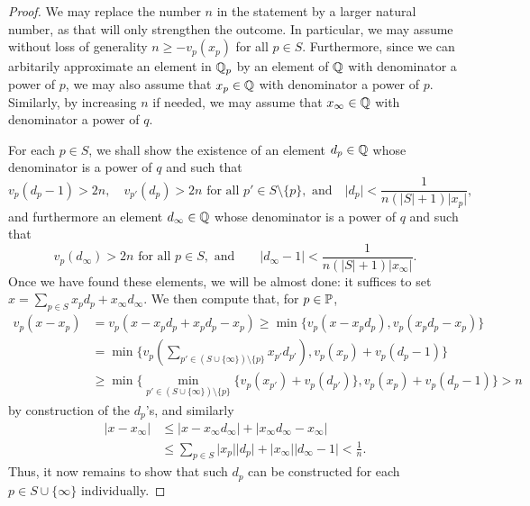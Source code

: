 \documentclass[12pt, leqno, british]{amsart}
\begin{document}
\begin{proof}
We may replace the number $n$ in the statement by a larger natural number, as that will only strengthen the outcome.
In particular, we may assume without loss of generality $n \geq -v_p(x_p)$ for all $p \in S$.
Furthermore, since we can arbitarily approximate an element in $\mathbb Q_p$ by an element of $\mathbb Q$ with denominator a power of $p$, we may also assume that $x_p \in \mathbb Q$ with denominator a power of $p$.
Similarly, by increasing $n$ if needed, we may assume that $x_\infty \in \mathbb Q$ with denominator a power of $q$.

For each $p \in S$, we shall show the existence of an element $d_p \in \mathbb Q$ whose denominator is a power of $q$ and such that
\begin{displaymath}
v_p(d_p-1) > 2n, \quad v_{p'}(d_p) > 2n \text{ for all } p' \in S \setminus \lbrace p \rbrace, \text{ and}\quad \lvert d_p \rvert < \frac{1}{n(\lvert S \rvert + 1) \lvert x_p \rvert},
\end{displaymath}
and furthermore an element $d_\infty \in \mathbb Q$ whose denominator is a power of $q$ and such that
\begin{displaymath}
v_p(d_\infty) > 2n \text{ for all } p \in S, \text{ and}\qquad \lvert d_\infty - 1 \rvert < \frac{1}{n(\lvert S \rvert + 1)\lvert x_\infty \rvert}.
\end{displaymath}
Once we have found these elements, we will be almost done: it suffices to set $x = \sum_{p \in S} x_pd_p + x_\infty d_\infty$.
We then compute that, for $p \in \mathbb P$,
\begin{align*}
v_p(x - x_p) &= v_p(x - x_pd_p + x_pd_p - x_p) \geq \min \lbrace v_p(x - x_pd_p), v_p(x_pd_p - x_p) \rbrace \\
&= \min \lbrace v_p(\sum_{p' \in (S \cup \lbrace \infty \rbrace) \setminus \lbrace p \rbrace} x_{p'}d_{p'}), v_p(x_p) + v_p(d_p - 1) \rbrace \\
&\geq \min \lbrace \min_{p' \in (S \cup \lbrace \infty \rbrace) \setminus \lbrace p \rbrace} \lbrace v_p(x_{p'}) + v_p(d_{p'}) \rbrace, v_p(x_p) + v_p(d_p - 1) \rbrace > n
\end{align*}
by construction of the $d_p$'s, and similarly
\begin{align*}
\lvert x - x_\infty \rvert &\leq \lvert x - x_\infty d_\infty \rvert + \lvert x_\infty d_\infty - x_\infty \rvert \\
&\leq \sum_{p \in S} \lvert x_p \rvert \lvert d_p \rvert + \lvert x_\infty \rvert \lvert d_\infty - 1 \rvert < \frac{1}{n}.
\end{align*}
Thus, it now remains to show that such $d_p$ can be constructed for each $p \in S \cup \lbrace \infty \rbrace$ individually.


\end{proof}
\end{document}
